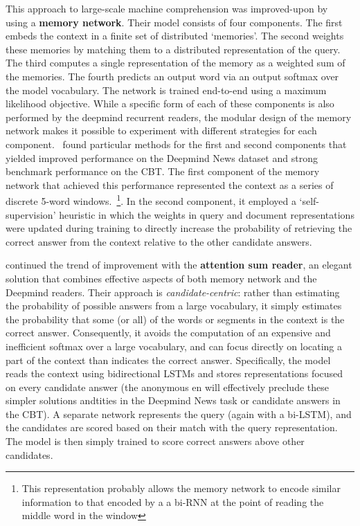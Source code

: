 \documentclass[11pt,letterpaper]{article}
\begin{document}
This approach to large-scale machine comprehension was improved-upon by~ using a {\bf memory network}. Their model consists of four components. The first embeds the context in a finite set of distributed `memories'. The second weights these memories by matching them to a distributed representation of the query. The third computes a single representation of the memory as a weighted sum of the memories. The fourth predicts an output word via an output softmax over the model vocabulary. The network is trained end-to-end using a maximum likelihood objective. While a specific form of each of these components is also performed by the deepmind recurrent readers, the modular design of the memory network makes it possible to experiment with different strategies for each component.~ found particular methods for the first and second components that yielded improved performance on the Deepmind News dataset and strong benchmark performance on the CBT. The first component of the memory network that achieved this performance represented the context as a series of discrete 5-word windows.~\footnote{This representation probably allows the memory network to encode similar information to that encoded by a a bi-RNN at the point of reading the middle word in the window}. In the second component, it employed a `self-supervision' heuristic in which the weights in query and document representations were updated during training to directly increase the probability of retrieving the correct answer from the context relative to the other candidate answers. 

 continued the trend of improvement with the {\bf attention sum reader}, an elegant solution that combines effective aspects of both memory network and the Deepmind readers. Their approach is \emph{candidate-centric}: rather than estimating the probability of possible answers from a large vocabulary, it simply estimates the probability that some (or all) of the words or segments in the context is the correct answer. Consequently, it avoids the computation of an expensive and inefficient softmax over a large vocabulary, and can focus directly on locating a part of the context than indicates the correct answer. Specifically, the model reads the context using bidirectional LSTMs and stores representations focused on every candidate answer (the anonymous en will effectively preclude these simpler solutions andtities in the Deepmind News task or candidate answers in the CBT). A separate network represents the query (again with a bi-LSTM), and the candidates are scored based on their match with the query representation. The model is then simply trained to score correct answers above other candidates.  
\end{document}
